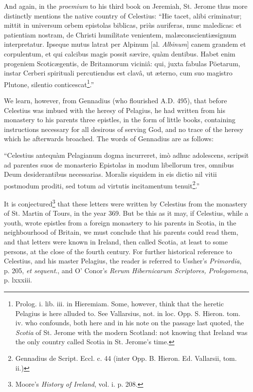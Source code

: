 \documentclass[11pt,oneside]{memoir}
\begin{document}
And again, in the \textit{proemium} to his third book on Jeremiah, St. Jerome thus more distinctly mentions the native country of Celestius: 
``Hie tacet, alibi criminatur; mittit in universum orbem epistolas biblicas, pri\`us auriferas, nunc maledicas: et patientiam nostram, de Christi humilitate venientem, mal\ae conscienti\ae signum interpretatur.
Ipseque mutus latrat per Alpinum [al. \textit{Albinum}] canem grandem et corpulentum, et qui calcibus magis possit s{\ae}vire, qu\`am dentibus.
Habet enim progeniem Scotic\ae gentis, de Britannorum vicini\^a: qui, juxta fabulas P\"oetarum, instar Cerberi spirituali percutiendus est clav\^a, ut {\ae}terno, cum suo magistro Plutone, silentio conticescat\footnote{
    Prolog. i. lib. iii. in Hieremiam.
    Some, however, think that the heretic Pelagius is here alluded to.
    See Vallarsius, not. in loc.
    Opp. S. Hieron. tom. iv. who confounds, both here and in his note on the passage last quoted, the \textit{Scotia} of St. Jerome with the modern Scotland: not knowing that Ireland was the only country called Scotia in St. Jerome's time. 
}.'' 

We learn, however, from Gennadius (who flourished A.D. 495), that before Celestius was imbued with the heresy of Pelagius, he had written from his monastery to his parents three epistles, in the form of little books, containing instructions necessary for all desirous of serving God, and no trace of the heresy which he afterwards broached.
The words of Gennadius are as follows: 

``Celestius antequ\`am Pelagianum dogma incurreret, im\`o adhuc adolescens, scripsit ad parentes suos de monasterio 
Epistolas in modum libellorum tres, omnibus Deum desiderantibus necessarias. Moralis siquidem in eis dictio nil vitii postmodum proditi, sed totum ad virtutis incitamentum tenuit\footnote{
    Gennadius de Script. Eccl. c. 44 (inter Opp. B. Hieron. Ed. Vallarsii, tom. ii.)
}.''

It is conjectured\footnote{
    Moore's \textit{History of Ireland}, vol. i. p. 208.
} that these letters were written by Celestius from the monastery of St. Martin of Tours, in the year 369.
But be this as it may, if Celestius, while a youth, wrote epistles from a foreign monastery to his parents in Scotia, in the neighbourhood of Britain, we must conclude that his parents could read them, and that letters were known in Ireland, then called Scotia, at least to some persons, at the close of the fourth century.
For further historical reference to Celestius, and his master Pelagius, the reader is referred to Ussher's \textit{Primordia}, p. 205, \textit{et sequent}., and O' Conor's \textit{Rerum Hibernicarum Scriptores, Prolegomena}, p. lxxxiii. 
\end{document}
